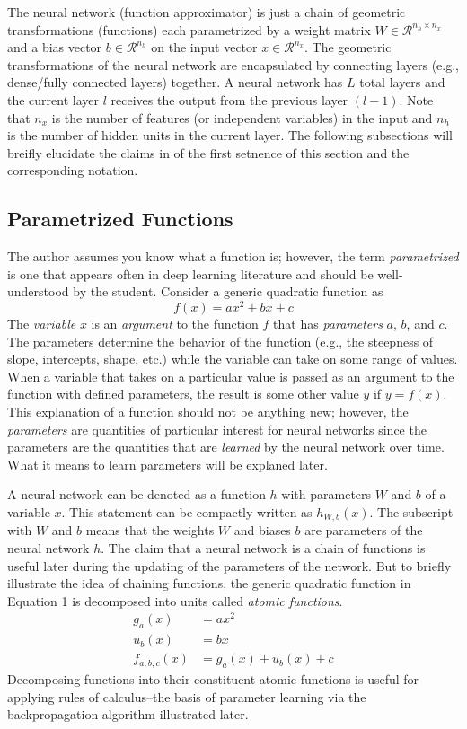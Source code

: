 \documentclass{article}
\begin{document}
\quad The neural network (function approximator) is just a chain of geometric transformations (functions)
each parametrized by a weight matrix $W \in \mathcal{R}^{n_h \times n_x}$ and
a bias vector $b \in \mathcal{R}^{n_h}$ on the input vector $x \in \mathcal{R}^{n_x}$.
The geometric transformations of the neural network are encapsulated by connecting
layers (e.g., dense/fully connected layers) together. A neural network has $L$ total
layers and the current layer $l$ receives the output from the previous layer $(l-1)$.
Note that $n_x$ is the number of features (or independent variables) in the input
and $n_h$ is the number of hidden units in the current layer. The following subsections will
breifly elucidate the claims in of the first setnence of this section and the
corresponding notation.

\subsection{Parametrized Functions}

The author assumes you know what a function is; however, the term \textit{parametrized}
is one that appears often in deep learning literature and should be well-understood by the student.
Consider a generic quadratic function \cite{MathSEVarsParamsArgs2015} as
\begin{equation}
	f(x) = ax^{2} + bx + c
\end{equation}
The \textit{variable} $x$ is an \textit{argument} to the function $f$ that has
\textit{parameters} $a$, $b$, and $c$. The parameters determine the behavior of
the function (e.g., the steepness of slope, intercepts, shape, etc.) while the
variable can take on some range of values. When a variable that takes on a particular
value is passed as an argument to the function with defined parameters, the result
is some other value $y$ if $y = f(x)$. This explanation of a function
should not be anything new; however, the \textit{parameters} are quantities
of particular interest for neural networks since the parameters are the quantities
that are \textit{learned} by the neural network over time. What it means to learn
parameters will be explaned later.

A neural network can be denoted as a function $h$ with parameters $W$
and $b$ of a variable $x$. This statement can be compactly written as
$h_{W, b}(x)$. The subscript with $W$ and $b$
means that the weights $W$ and biases $b$ are parameters of the neural network $h$.
The claim that a neural network is a chain of functions is useful later during
the updating of the parameters of the network. But to briefly illustrate the idea
of chaining functions, the generic quadratic function in Equation 1 is decomposed
into units called \textit{atomic functions}.
\begin{align}
	g_{a}(x)     & = ax^{2}                  \\
	u_{b}(x)     & = bx                      \\
	f_{a,b,c}(x) & = g_{a}(x) + u_{b}(x) + c
\end{align}
Decomposing functions into their constituent atomic functions is useful
for applying rules of calculus--the basis of parameter learning via
the backpropagation algorithm illustrated later.
\end{document}
